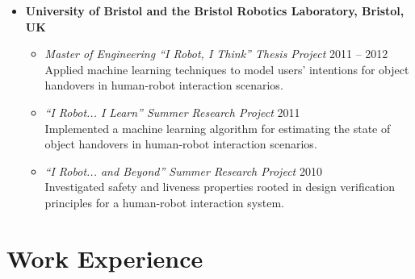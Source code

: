 \documentclass[10pt,letterpaper]{article}
\newcommand{\thing}[2]{{#1} \hfill {#2}}
\begin{document}
\begin{itemize}
\item {\bf University of Bristol and the Bristol Robotics Laboratory, Bristol, UK}\\
	\begin{itemize}\setlength\itemsep{0.8em}\vspace{-1em}
	\item \thing{\it Master of Engineering ``I Robot, I Think'' Thesis Project}{2011 -- 2012}\vspace{0.1em}\\
	Applied machine learning techniques to model users' intentions for object handovers in human-robot interaction scenarios.
	\item \thing{\it ``I Robot... I Learn'' Summer Research Project}{2011}\vspace{-0.1em}\\
	Implemented a machine learning algorithm for estimating the state of object handovers in human-robot interaction scenarios.
	\item \thing{\it ``I Robot... and Beyond'' Summer Research Project}{2010}\vspace{-0.1em}\\
	 Investigated safety and liveness properties rooted in design verification principles for a human-robot interaction system. 
	\end{itemize}
\end{itemize}

\section{Work Experience}
\end{document}
